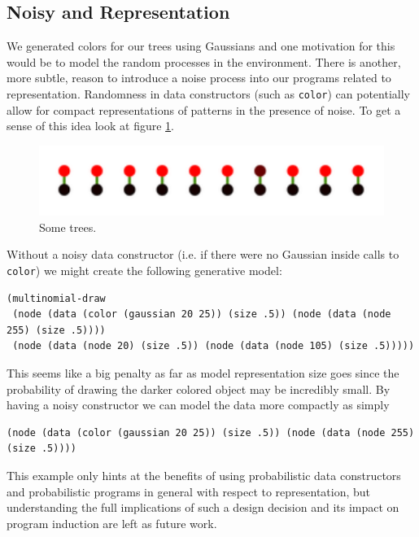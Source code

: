 \documentclass[a4paper,10pt]{article}
\begin{document}
\subsection{Noisy and Representation}
We generated colors for our trees using Gaussians and one motivation for this would be to model the random processes in the environment.  There is another, more subtle, reason to introduce a noise process into our programs related to representation.  Randomness in data constructors (such as \texttt{color}) can potentially allow for compact representations of patterns in the presence of noise.  To get a sense of this idea look at figure \ref{fig:noiseCons}. 
\begin{figure}[h]
\begin{center}
\includegraphics[scale=.60]{noisyConstructor.pdf}
\end{center}
\caption{Some trees.}
\label{fig:noiseCons}
\end{figure}
Without a noisy data constructor (i.e. if there were no Gaussian inside calls to \texttt{color}) we might create the following generative model:
\begin{lstlisting}
(multinomial-draw
 (node (data (color (gaussian 20 25)) (size .5)) (node (data (node 255) (size .5))))
 (node (data (node 20) (size .5)) (node (data (node 105) (size .5)))))
\end{lstlisting}
This seems like a big penalty as far as model representation size goes since the probability of drawing the darker colored object may be incredibly small.  By having a noisy constructor we can model the data more compactly as simply 
\begin{lstlisting}
(node (data (color (gaussian 20 25)) (size .5)) (node (data (node 255) (size .5))))
\end{lstlisting}
This example only hints at the benefits of using probabilistic data constructors and probabilistic programs in general with respect to representation, but understanding the full implications of such a design decision and its impact on program induction are left as future work.
\end{document}

